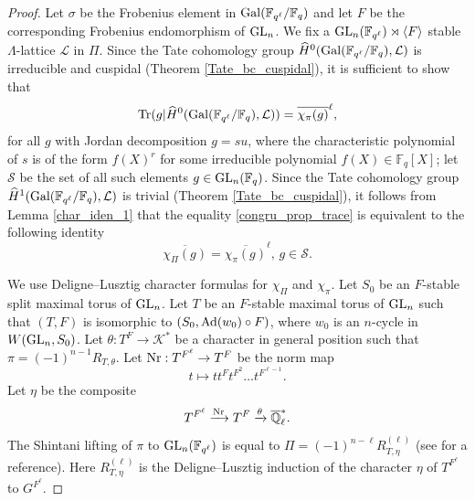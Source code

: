 \documentclass[10pt, reqno]{amsart}
\theoremstyle{plain}
\numberwithin{equation}{section} \newcommand{\di}{\operatorname{dim}}
\begin{document}
\begin{proof}
Let $\sigma$ be the Frobenius element in ${\rm Gal}(\mathbb{F}_{q^\ell}/
\mathbb{F}_q)$ and let $F$ be the corresponding Frobenius 
endomorphism of ${\rm GL}_n$.
We fix a ${\rm GL}_n(\mathbb{F}_{q^\ell})
\rtimes\langle F\rangle$ stable 
$\Lambda$-lattice $\mathcal{L}$ in $\Pi$. 
Since the Tate cohomology group 
$\widehat{H}^0({\rm Gal}(\mathbb{F}_{q^\ell}/
\mathbb{F}_q), \mathcal{L})$ is 
irreducible and cuspidal 
(Theorem \ref{Tate_bc_cuspidal}), 
it is sufficient to show that
\begin{equation}\label{congru_prop_trace}
    {\rm Tr}(g|{\widehat{H}^0({\rm Gal}(\mathbb{F}_{q^\ell}/
\mathbb{F}_q), \mathcal{L})}) = \overline{\chi_\pi(g)}^\ell,
\end{equation} 
for all $g$ with Jordan decomposition $g=su$, where the
characteristic polynomial of $s$ is of the form 
 $f(X)^r$ for some
irreducible polynomial $f(X)\in\mathbb{F}_q[X]$; let $\mathcal{S}$
be the set of all such elements $g\in {\rm GL}_n(\mathbb{F}_q)$. 
Since the Tate
cohomology group $\widehat{H}^1( {\rm Gal}(\mathbb{F}_{q^\ell}/
\mathbb{F}_q), \mathcal{L})$ is trivial (Theorem
\ref{Tate_bc_cuspidal}), it follows from Lemma \ref{char_iden_1} that
the equality \eqref{congru_prop_trace} is equivalent to the following identity
$$ \overline{\chi_\Pi(g)} = 
\overline{\chi_\pi(g)}^\ell,\, g\in \mathcal{S}.$$ 

We use Deligne--Lusztig character formulas for $\chi_\Pi$ and $\chi_\pi$. 
Let $S_0$ be an $F$-stable split maximal torus of ${\rm GL}_n$. 
Let $T$ be an $F$-stable maximal torus of ${\rm GL}_n$ such that 
$(T, F)$ is isomorphic to $(S_0, {\rm Ad}(w_0)\circ F)$, 
where $w_0$ is an $n$-cycle 
in $W({\rm GL}_n, S_0)$. Let
$\theta:T^F\rightarrow \mathcal{K}^\ast$
be a character in general position such that 
$\pi=(-1)^{n-1}R_{T, \theta}$. Let ${\rm Nr}:T^{F^\ell}\rightarrow T^F$
be the norm map 
$$t\mapsto tt^Ft^{F^2}\dots t^{F^{\ell-1}}.$$
Let $\eta$ be the composite 
$$T^{F^\ell}\xrightarrow{\rm Nr} T^F\xrightarrow{\theta}
\overline{\mathbb{Q}}_\ell^\ast.$$ The Shintani lifting of $\pi$ to
${\rm GL}_{n}(\mathbb{F}_{q^\ell})$ is equal to
$\Pi=(-1)^{n-\ell}R^{(\ell)}_{T,\eta}$ (see
\cite{Kawanaka_Shintani_lift} for a reference). Here
$R^{(\ell)}_{T, \eta}$ is the Deligne--Lusztig induction of the
character $\eta$ of $T^{F^\ell}$ to $G^{F^\ell}$.


\end{proof}
\end{document}
